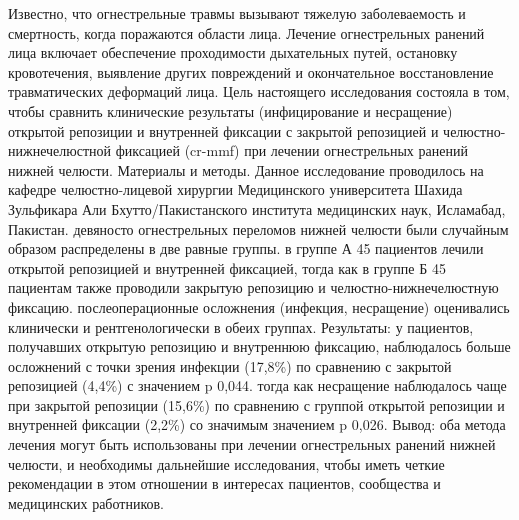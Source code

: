 Известно, что огнестрельные травмы вызывают тяжелую заболеваемость и смертность,
когда поражаются области лица. Лечение огнестрельных ранений лица включает
обеспечение проходимости дыхательных путей, остановку кровотечения, выявление
других повреждений и окончательное восстановление травматических деформаций
лица. Цель настоящего исследования состояла в том, чтобы сравнить клинические
результаты (инфицирование и несращение) открытой репозиции и внутренней фиксации
с закрытой репозицией и челюстно-нижнечелюстной фиксацией (cr-mmf) при лечении
огнестрельных ранений нижней челюсти. Материалы и методы. Данное исследование
проводилось на кафедре челюстно-лицевой хирургии Медицинского университета
Шахида Зульфикара Али Бхутто/Пакистанского института медицинских наук,
Исламабад, Пакистан. девяносто огнестрельных переломов нижней челюсти были
случайным образом распределены в две равные группы. в группе А 45 пациентов
лечили открытой репозицией и внутренней фиксацией, тогда как в группе Б 45
пациентам также проводили закрытую репозицию и челюстно-нижнечелюстную фиксацию.
послеоперационные осложнения (инфекция, несращение) оценивались клинически и
рентгенологически в обеих группах. Результаты: у пациентов, получавших открытую
репозицию и внутреннюю фиксацию, наблюдалось больше осложнений с точки зрения
инфекции (17,8\%) по сравнению с закрытой репозицией (4,4\%) с значением p
0,044.  тогда как несращение наблюдалось чаще при закрытой репозиции (15,6\%) по
сравнению с группой открытой репозиции и внутренней фиксации (2,2\%) со значимым
значением p 0,026. Вывод: оба метода лечения могут быть использованы при лечении
огнестрельных ранений нижней челюсти, и необходимы дальнейшие исследования,
чтобы иметь четкие рекомендации в этом отношении в интересах пациентов,
сообщества и медицинских работников.\cite{32467805}

